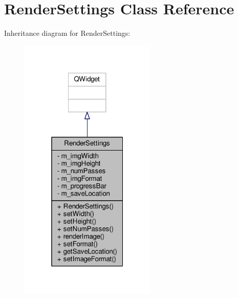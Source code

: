 \hypertarget{class_render_settings}{\section{Render\-Settings Class Reference}
\label{class_render_settings}
}


Inheritance diagram for Render\-Settings\-:
\nopagebreak
\begin{figure}[H]
\begin{center}
\leavevmode
\includegraphics[width=184pt]{class_render_settings__inherit__graph}
\end{center}
\end{figure}


